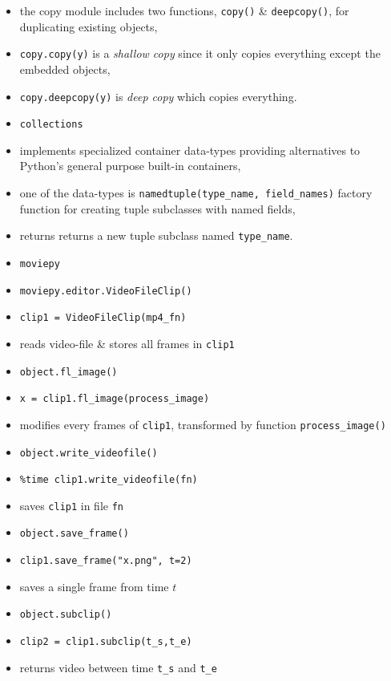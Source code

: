 \documentclass[onecolumn]{IEEEtran} %
\begin{document}
\begin{itemize}
    \bi
        \item the copy module includes two functions, \verb|copy()| \& \verb|deepcopy()|, for duplicating existing objects,
        \item \verb|copy.copy(y)| is a \emph{shallow copy} since it only copies everything except the embedded objects,
        \item \verb|copy.deepcopy(y)| is \emph{deep copy} which copies everything.
    \ei
    \item \verb|collections|
    \bi
        \item implements specialized container data-types providing alternatives to Python’s general purpose built-in containers,
        \item one of the data-types is \verb|namedtuple(type_name, field_names)| factory function for creating tuple subclasses with named fields,
        \bi
            \item returns returns a new tuple subclass named \verb|type_name|.
        \ei
    \ei
    \item \verb|moviepy|
    \bi
        \item \verb|moviepy.editor.VideoFileClip()|
        \bi
            \item \verb|clip1 = VideoFileClip(mp4_fn)|
            \item reads video-file \& stores all frames in \verb|clip1|
        \ei
        \item \verb|object.fl_image()|
        \bi
            \item \verb|x = clip1.fl_image(process_image)|
            \item modifies every frames of \verb|clip1|, transformed by function \verb|process_image()|
        \ei
        \item \verb|object.write_videofile()|
        \bi
            \item \verb|%time clip1.write_videofile(fn)|
            \item saves \verb|clip1| in file \verb|fn|
        \ei
        \item \verb|object.save_frame()|
        \bi
            \item \verb|clip1.save_frame("x.png", t=2)|
            \item saves a single frame from time $t$
        \ei
        \item \verb|object.subclip()|
        \bi
            \item \verb|clip2 = clip1.subclip(t_s,t_e)|
            \item returns video between time \verb|t_s| and \verb|t_e|

\end{itemize}
\end{document}
